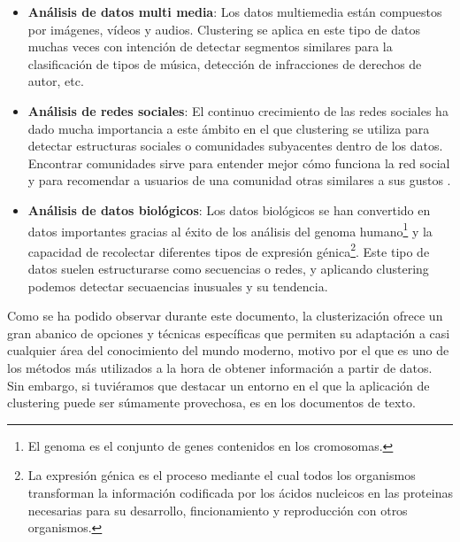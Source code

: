 \documentclass[10pt, a4paper]{article}
\begin{document}
\begin{itemize}
  \item \textbf{Análisis de datos multi media}: Los datos multiemedia están compuestos por imágenes, vídeos y audios. Clustering se aplica en este tipo de datos muchas veces con intención de detectar segmentos similares para la clasificación de tipos de música, detección de infracciones de derechos de autor, etc.
  
  \item \textbf{Análisis de redes sociales}: El continuo crecimiento de las redes sociales ha dado mucha importancia a este ámbito en el que clustering se utiliza para detectar estructuras sociales o comunidades subyacentes dentro de los datos. Encontrar comunidades sirve para entender mejor cómo funciona la red social y para recomendar a usuarios de una comunidad otras similares a sus gustos \cite{11}.
  
  \item \textbf{Análisis de datos biológicos}: Los datos biológicos se han convertido en datos importantes gracias al éxito de los análisis del genoma humano\footnote{El genoma es el conjunto de genes contenidos en los cromosomas.} y la capacidad de recolectar diferentes tipos de expresión génica\footnote{La expresión génica es el proceso mediante el cual todos los organismos transforman la información codificada por los ácidos nucleicos en las proteinas necesarias para su desarrollo, fincionamiento y reproducción con otros organismos.}. Este tipo de datos suelen estructurarse como secuencias o redes, y aplicando clustering podemos detectar secuaencias inusuales y su tendencia. 
\end{itemize}


Como se ha podido observar durante este documento, la clusterización ofrece un gran abanico de opciones y técnicas específicas que permiten su adaptación a casi cualquier área del conocimiento del mundo moderno, motivo por el que es uno de los métodos más utilizados a la hora de obtener información a partir de datos. Sin embargo, si tuviéramos que destacar un entorno en el que la aplicación de clustering puede ser súmamente provechosa, es en los documentos de texto. 


\end{document}
